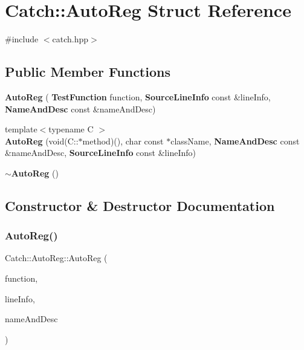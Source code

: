 \section{Catch\+:\+:Auto\+Reg Struct Reference}
\label{struct_catch_1_1_auto_reg}


{\ttfamily \#include $<$catch.\+hpp$>$}

\subsection*{Public Member Functions}
\begin{DoxyCompactItemize}
\item 
\textbf{ Auto\+Reg} (\textbf{ Test\+Function} function, \textbf{ Source\+Line\+Info} const \&line\+Info, \textbf{ Name\+And\+Desc} const \&name\+And\+Desc)
\item 
{\footnotesize template$<$typename C $>$ }\\\textbf{ Auto\+Reg} (void(C\+::$\ast$method)(), char const $\ast$class\+Name, \textbf{ Name\+And\+Desc} const \&name\+And\+Desc, \textbf{ Source\+Line\+Info} const \&line\+Info)
\item 
\textbf{ $\sim$\+Auto\+Reg} ()
\end{DoxyCompactItemize}


\subsection{Constructor \& Destructor Documentation}
\mbox{\label{struct_catch_1_1_auto_reg_af224f4568d57b8652474df475a164a8c}} 
\subsubsection{Auto\+Reg()\hspace{0.1cm}{\footnotesize\ttfamily [1/2]}}
{\footnotesize\ttfamily Catch\+::\+Auto\+Reg\+::\+Auto\+Reg (\begin{DoxyParamCaption}\item[{\textbf{ Test\+Function}}]{function,  }\item[{\textbf{ Source\+Line\+Info} const \&}]{line\+Info,  }\item[{\textbf{ Name\+And\+Desc} const \&}]{name\+And\+Desc }\end{DoxyParamCaption})}

